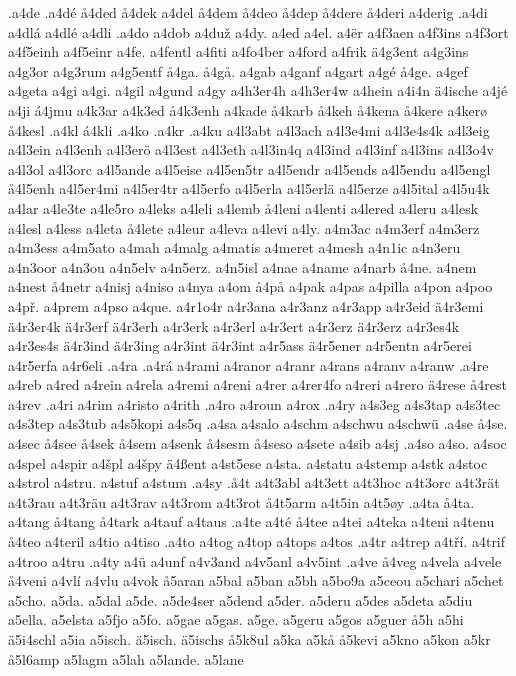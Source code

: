 .a4de
.a4dé
å4ded
å4dek
a4del
å4dem
å4deo
å4dep
å4dere
å4deri
a4derig
.a4di
a4dlá
a4dlé
a4dli
.a4do
a4dob
a4duž
a4dy.
a4ed
a4el.
a4ër
a4f3aen
a4f3ins
a4f3ort
a4f5einh
a4f5einr
a4fe.
a4fentl
a4fiti
a4fo4ber
a4ford
a4frik
ä4g3ent
a4g3ins
a4g3or
a4g3rum
a4g5entf
å4ga.
å4gå.
a4gab
a4ganf
a4gart
a4gé
å4ge.
a4gef
a4geta
a4gi
a4gi.
a4gil
a4gund
a4gy
a4h3er4h
a4h3er4w
a4hein
a4i4n
ä4ische
a4jé
a4ji
á4jmu
a4k3ar
a4k3ed
å4k3enh
a4kade
å4karb
å4keh
å4kena
å4kere
a4kerø
å4kesl
.a4kl
á4kli
.a4ko
.a4kr
.a4ku
a4l3abt
a4l3ach
a4l3e4mi
a4l3e4s4k
a4l3eig
a4l3ein
a4l3enh
a4l3erö
a4l3est
a4l3eth
a4l3in4q
a4l3ind
a4l3inf
a4l3ins
a4l3o4v
a4l3ol
a4l3orc
a4l5ande
a4l5eise
a4l5en5tr
a4l5endr
a4l5ends
a4l5endu
a4l5engl
å4l5enh
a4l5er4mi
a4l5er4tr
a4l5erfo
a4l5erla
a4l5erlä
a4l5erze
a4l5ital
a4l5u4k
a4lar
a4le3te
a4le5ro
a4leks
a4leli
a4lemb
å4leni
a4lenti
a4lered
a4leru
a4lesk
a4lesl
a4less
a4leta
å4lete
a4leur
a4leva
a4levi
a4ly.
a4m3ac
a4m3erf
a4m3erz
a4m3ess
a4m5ato
a4mah
a4malg
a4matis
a4meret
a4mesh
a4n1ic
a4n3eru
a4n3oor
a4n3ou
a4n5elv
a4n5erz.
a4n5isl
a4nae
a4name
a4narb
å4ne.
a4nem
a4nest
å4netr
a4nisj
a4niso
a4nya
a4om
å4på
a4pak
a4pas
a4pilla
a4pon
a4poo
a4př.
a4prem
a4pso
a4que.
a4r1o4r
a4r3ana
a4r3anz
a4r3app
a4r3eid
ä4r3emi
ä4r3er4k
ä4r3erf
ä4r3erh
a4r3erk
a4r3erl
a4r3ert
a4r3erz
ä4r3erz
a4r3es4k
a4r3es4s
ä4r3ind
ä4r3ing
a4r3int
ä4r3int
a4r5ass
ä4r5ener
a4r5entn
a4r5erei
a4r5erfa
a4r6eli
.a4ra
.a4rá
a4rami
a4ranor
a4ranr
a4rans
a4ranv
a4ranw
.a4re
a4reb
a4red
a4rein
a4rela
a4remi
a4reni
a4rer
a4rer4fo
a4reri
a4rero
ä4rese
å4rest
a4rev
.a4ri
a4rim
a4risto
a4rith
.a4ro
a4roun
a4rox
.a4ry
a4s3eg
a4s3tap
a4s3tec
a4s3tep
a4s3tub
a4s5kopi
a4s5q
.a4sa
a4salo
a4schm
a4schwu
a4schwü
.a4se
å4se.
a4sec
å4see
å4sek
å4sem
a4senk
å4sesm
å4seso
a4sete
a4sib
a4sj
.a4so
a4so.
a4soc
a4spel
a4spir
a4špl
a4špy
ä4ßent
a4st5ese
a4sta.
a4statu
a4stemp
a4stk
a4stoc
a4strol
a4stru.
a4stuf
a4stum
.a4sy
.å4t
a4t3abl
a4t3ett
a4t3hoc
a4t3orc
a4t3rät
a4t3rau
a4t3räu
a4t3rav
a4t3rom
a4t3rot
å4t5arm
a4t5in
a4t5øy
.a4ta
å4ta.
a4tang
å4tang
å4tark
a4tauf
a4taus
.a4te
a4té
å4tee
a4tei
a4teka
a4teni
a4tenu
å4teo
a4teril
a4tio
a4tiso
.a4to
a4tog
a4top
a4tops
a4tos
.a4tr
a4trep
a4tří.
a4trif
a4troo
a4tru
.a4ty
a4ü
a4unf
a4v3and
a4v5anl
a4v5int
.a4ve
å4veg
a4vela
a4vele
å4veni
a4vlí
a4vlu
a4vok
å5aran
a5bal
a5ban
a5bh
a5bo9a
a5ceou
a5chari
a5chet
a5cho.
a5da.
a5dal
a5de.
a5de4ser
a5dend
a5der.
a5deru
a5des
a5deta
a5diu
a5ella.
a5elsta
a5fjo
a5fo.
a5gae
a5gas.
a5ge.
a5geru
a5gos
a5guer
å5h
a5hi
ä5i4schl
a5ia
a5isch.
ä5isch.
ä5ischs
å5k8ul
a5ka
a5kå
å5kevi
a5kno
a5kon
a5kr
å5l6amp
a5lagm
a5lah
a5lande.
a5lane
